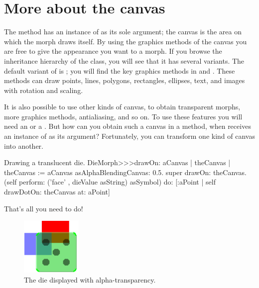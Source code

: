\documentclass[a4paper,10pt,twoside]{book}
\begin{document}


\section{More about the canvas}

The  method has an instance of  as its sole argument;
the canvas is the area on which the morph draws itself.
By using the graphics methods of the canvas you are free to give the appearance you want to a morph.
If you browse the inheritance hierarchy of the  class, you will see that it has several variants.
The default variant of  is ; you will find the key graphics methods in  and .
These methods can draw points, lines, polygons, rectangles, ellipses, text, and images with rotation and scaling.

It is also possible to use other kinds of canvas, to obtain transparent morphs, more graphics methods, antialiasing, and so on.
To use these features you will need an  or a .
But how can you obtain such a canvas in a  method, when  receives an instance of  as its argument?
Fortunately, you can transform one kind of canvas into another.

\begin{method}{Drawing a translucent die.}
DieMorph>>>drawOn: aCanvas
	| theCanvas |
	theCanvas := aCanvas asAlphaBlendingCanvas: 0.5.
	super drawOn: theCanvas.
	(self perform: ('face' , dieValue asString) asSymbol)
		do: [:aPoint | self drawDotOn: theCanvas at: aPoint]
\end{method}
\noindent
That's all you need to do!

\begin{figure}[ht]
	\centerline{\includegraphics[scale=0.7]{multiMorphs}}
	\caption{The die displayed with alpha-transparency.
		}
\end{figure}
\end{document}
